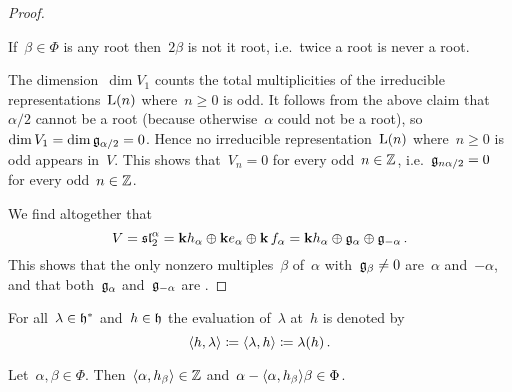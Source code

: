 \begin{proof}
  \begin{claim*}
    If~$\beta \in \Phi$ is any root then~$2 \beta$ is not it root, i.e.\ twice a root is never a root.
  \end{claim*}
 
  The dimension~$\dim V_1$ counts the total multiplicities of the irreducible representations~$\operatorname{L}(n)$ where~$n \geq 0$ is odd.
  It follows from the above claim that~$\alpha/2$ cannot be a root (because otherwise~$\alpha$ could not be a root), so~$\dim V_1 = \dim \mathfrak{g}_{\alpha/2} = 0$.
  Hence no irreducible representation~$\operatorname{L}(n)$ where~$n \geq 0$ is odd appears in~$V$.
  This shows that~$V_n = 0$ for every odd~$n \in \mathbb{Z}$, i.e.~$\mathfrak{g}_{n \alpha/2} = 0$ for every odd~$n \in \mathbb{Z}$.
  
  We find altogether that
  \[
    V
    =
    \mathfrak{sl}_2^\alpha
    =
    \mathbf{k} h_\alpha \oplus \mathbf{k} e_\alpha \oplus \mathbf{k} \, f_\alpha 
    =
    \mathbf{k} h_\alpha \oplus \mathfrak{g}_\alpha \oplus \mathfrak{g}_{-\alpha} \,.
  \]
  This shows that the only nonzero multiples~$\beta$ of~$\alpha$ with~$\mathfrak{g}_\beta \neq 0$ are~$\alpha$ and~$-\alpha$, and that both~$\mathfrak{g}_\alpha$ and~$\mathfrak{g}_{-\alpha}$ are {\onedimensional}.
\end{proof}


\begin{definition}
  For all~$\lambda \in \mathfrak{h}^*$ and~$h \in \mathfrak{h}$ the evaluation of~$\lambda$ at~$h$ is denoted by
  \[
    \langle h, \lambda\rangle
    \coloneqq
    \langle\lambda, h\rangle
    \coloneqq
    \lambda(h)  \,.
  \]
\end{definition}




\begin{proposition}
\label{integral and reflection properties of root pairing}
  Let~$\alpha, \beta \in \Phi$.
  Then~$\langle\alpha, h_\beta\rangle \in \mathbb{Z}$ and~$\alpha - \langle\alpha, h_\beta\rangle \beta \in \Phi$.
\end{proposition}


